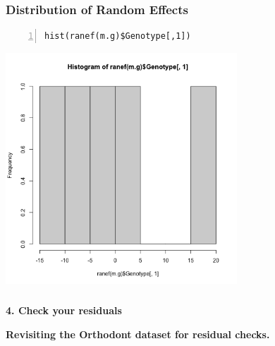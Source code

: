 \documentclass{beamer}
\begin{document}
\begin{frame}[fragile]
    \frametitle{Distribution of Random Effects}
    \small\begin{Verbatim}[numbers=left,numbersep=6pt,frame=single]
hist(ranef(m.g)$Genotype[,1])        
    \end{Verbatim}
    \begin{center}
    \includegraphics[width=0.65\textwidth]{lectures/day_7_diagnostics_of_mems/figures/unnamed-chunk-23-1.png}        
    \end{center}
\end{frame}

\begin{frame}
    \frametitle{}
    \huge\color{purple}\textbf{4. Check your residuals}
    \vspace{0.5cm}
    
    \normalsize\color{black}\textbf{Revisiting the Orthodont dataset for residual checks.}
\end{frame}
\end{document}
